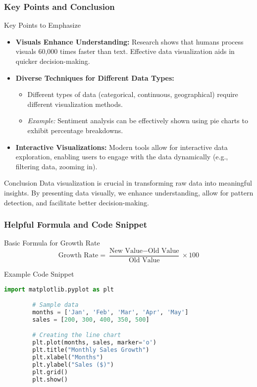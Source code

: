 \documentclass[aspectratio=169]{beamer}
\begin{document}
\begin{frame}[fragile]
    \frametitle{Key Points and Conclusion}
    \begin{block}{Key Points to Emphasize}
        \begin{itemize}
            \item \textbf{Visuals Enhance Understanding:} Research shows that humans process visuals 60,000 times faster than text. Effective data visualization aids in quicker decision-making.
            \item \textbf{Diverse Techniques for Different Data Types:}
            \begin{itemize}
                \item Different types of data (categorical, continuous, geographical) require different visualization methods.
                \item \textit{Example:} Sentiment analysis can be effectively shown using pie charts to exhibit percentage breakdowns.
            \end{itemize}
            \item \textbf{Interactive Visualizations:} Modern tools allow for interactive data exploration, enabling users to engage with the data dynamically (e.g., filtering data, zooming in).
        \end{itemize}
    \end{block}
    \begin{block}{Conclusion}
        Data visualization is crucial in transforming raw data into meaningful insights. By presenting data visually, we enhance understanding, allow for pattern detection, and facilitate better decision-making.
    \end{block}
\end{frame}

\begin{frame}[fragile]
    \frametitle{Helpful Formula and Code Snippet}
    \begin{block}{Basic Formula for Growth Rate}
        \begin{equation}
            \text{Growth Rate} = \frac{\text{New Value} - \text{Old Value}}{\text{Old Value}} \times 100
        \end{equation}
    \end{block}
    
    \begin{block}{Example Code Snippet}
        \begin{lstlisting}[language=Python]
        import matplotlib.pyplot as plt

        # Sample data
        months = ['Jan', 'Feb', 'Mar', 'Apr', 'May']
        sales = [200, 300, 400, 350, 500]

        # Creating the line chart
        plt.plot(months, sales, marker='o')
        plt.title("Monthly Sales Growth")
        plt.xlabel("Months")
        plt.ylabel("Sales ($)")
        plt.grid()
        plt.show()
        \end{lstlisting}
    \end{block}
\end{frame}
\end{document}
